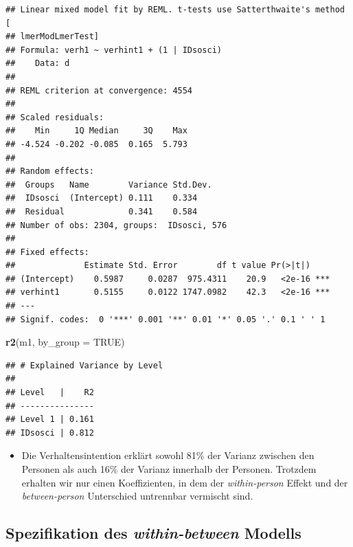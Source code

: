\documentclass[
]{book}
\newenvironment{Shaded}{\begin{snugshade}}{\end{snugshade}}
\newcommand{\DataTypeTok}[1]{\textcolor[rgb]{0.13,0.29,0.53}{#1}}
\newcommand{\KeywordTok}[1]{\textcolor[rgb]{0.13,0.29,0.53}{\textbf{#1}}}
\newcommand{\NormalTok}[1]{#1}
\newcommand{\OperatorTok}[1]{\textcolor[rgb]{0.81,0.36,0.00}{\textbf{#1}}}
\newcommand{\OtherTok}[1]{\textcolor[rgb]{0.56,0.35,0.01}{#1}}
\newcommand{\StringTok}[1]{\textcolor[rgb]{0.31,0.60,0.02}{#1}}
\providecommand{\tightlist}{%
  \setlength{\itemsep}{0pt}\setlength{\parskip}{0pt}}
\begin{document}
\begin{Shaded}
\end{Shaded}

\begin{verbatim}
## Linear mixed model fit by REML. t-tests use Satterthwaite's method [
## lmerModLmerTest]
## Formula: verh1 ~ verhint1 + (1 | IDsosci)
##    Data: d
## 
## REML criterion at convergence: 4554
## 
## Scaled residuals: 
##    Min     1Q Median     3Q    Max 
## -4.524 -0.202 -0.085  0.165  5.793 
## 
## Random effects:
##  Groups   Name        Variance Std.Dev.
##  IDsosci  (Intercept) 0.111    0.334   
##  Residual             0.341    0.584   
## Number of obs: 2304, groups:  IDsosci, 576
## 
## Fixed effects:
##              Estimate Std. Error        df t value Pr(>|t|)    
## (Intercept)    0.5987     0.0287  975.4311    20.9   <2e-16 ***
## verhint1       0.5155     0.0122 1747.0982    42.3   <2e-16 ***
## ---
## Signif. codes:  0 '***' 0.001 '**' 0.01 '*' 0.05 '.' 0.1 ' ' 1
\end{verbatim}

\begin{Shaded}
\begin{Highlighting}[]
\KeywordTok{r2}\NormalTok{(m1, }\DataTypeTok{by_group =} \OtherTok{TRUE}\NormalTok{)}
\end{Highlighting}
\end{Shaded}

\begin{verbatim}
## # Explained Variance by Level
## 
## Level   |    R2
## ---------------
## Level 1 | 0.161
## IDsosci | 0.812
\end{verbatim}

\begin{itemize}
\tightlist
\item
  Die Verhaltensintention erklärt sowohl 81\% der Varianz zwischen den Personen als auch 16\% der Varianz innerhalb der Personen. Trotzdem erhalten wir nur einen Koeffizienten, in dem der \emph{within-person} Effekt und der \emph{between-person} Unterschied untrennbar vermischt sind.
\end{itemize}

\hypertarget{spezifikation-des-within-between-modells}{%
\subsection*{\texorpdfstring{Spezifikation des \emph{within-between} Modells}{Spezifikation des within-between Modells}}\label{spezifikation-des-within-between-modells}}
\end{document}
